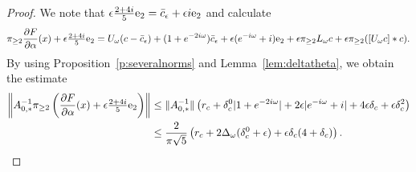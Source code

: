 \begin{proof}
We note that $\epsilon  \tfrac{2 +4 i}{5} \mathrm{e}_2= \bar{c}_\epsilon + \epsilon i \mathrm{e}_2$
and calculate 
	\[
\pi_{\geq 2} 
		\frac{\partial F}{\partial \alpha}(x)  +   \epsilon  \tfrac{2 +4 i}{5}  \mathrm{e}_2  =
	U_\omega (c-\bar{c}_\epsilon) + (1+ e^{-2i\omega}) \bar{c}_\epsilon + \epsilon  (e^{-i \omega} +i)\mathrm{e}_2 + \epsilon \pi_{\geq 2} L_\omega c + \epsilon  \pi_{\geq 2} ([ U_\omega c] * c ).
	\]
By using Proposition~\ref{p:severalnorms} and Lemma~\ref{lem:deltatheta}, we obtain the estimate
	\begin{alignat*}{1}
	\left\| A_{0,*}^{-1} \pi_{\geq 2} \left(
	\frac{\partial F}{\partial \alpha}(x)  +   \epsilon  \tfrac{2 +4 i}{5}  \mathrm{e}_2  \right) \right\|
	&\leq \| A_{0,*}^{-1} \| \left( r_c +  \delta_c^0 |1+ e^{-2i\omega} | +  2 \epsilon | e^{-i \omega } +i| + 4 \epsilon \delta_c + \epsilon \delta_c^2 \right) \\
	&\leq \frac{2}{\pi \sqrt{5}}\left( r_c +  2 \Delta_\omega (  \delta_c^0 +  \epsilon )  + \epsilon \delta_c (4 + \delta_c )  \right) .
	\end{alignat*}
\end{proof}




